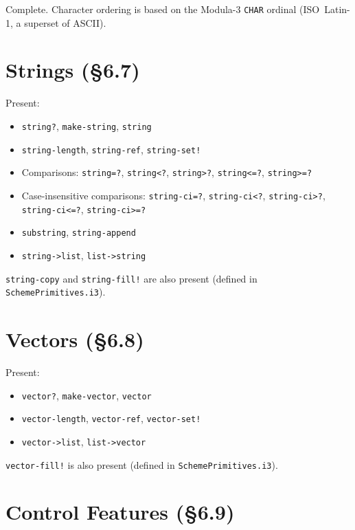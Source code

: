 \documentclass[12pt]{report}
\begin{document}
\noindent
Complete.  Character ordering is based on the Modula-3 {\tt CHAR}
ordinal (ISO~Latin-1, a superset of ASCII).

\section{Strings (\S6.7)}

Present:
\begin{itemize}[nosep]
\item {\tt string?}, {\tt make-string}, {\tt string}
\item {\tt string-length}, {\tt string-ref}, {\tt string-set!}
\item Comparisons: {\tt string=?}, {\tt string<?}, {\tt string>?},
  {\tt string<=?}, {\tt string>=?}
\item Case-insensitive comparisons: {\tt string-ci=?}, {\tt string-ci<?},
  {\tt string-ci>?}, {\tt string-ci<=?}, {\tt string-ci>=?}
\item {\tt substring}, {\tt string-append}
\item {\tt string->list}, {\tt list->string}
\end{itemize}

\noindent
{\tt string-copy} and {\tt string-fill!} are also present
(defined in {\tt SchemePrimitives.i3}).

\section{Vectors (\S6.8)}

Present:
\begin{itemize}[nosep]
\item {\tt vector?}, {\tt make-vector}, {\tt vector}
\item {\tt vector-length}, {\tt vector-ref}, {\tt vector-set!}
\item {\tt vector->list}, {\tt list->vector}
\end{itemize}

\noindent
{\tt vector-fill!} is also present (defined in {\tt SchemePrimitives.i3}).

\section{Control Features (\S6.9)}
\end{document}
